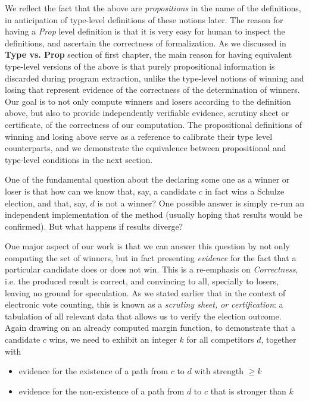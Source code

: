 \noindent
We reflect the fact that the above are \emph{propositions} in
the name of the definitions, in anticipation of type-level
definitions of these notions later. The reason for having a \textit{Prop} level definition is that 
 it is very easy for human to inspect the definitions, and ascertain the correctness of formalization.
As we discussed in 
\textbf{Type vs. Prop} section of first chapter, the main reason 
for having equivalent
type-level versions of the above is that purely propositional
information is discarded during program extraction, unlike
the type-level notions of winning and losing that represent evidence
of the correctness of the determination of winners. Our goal is to 
not only compute winners and losers according to the
definition above, but also to provide independently verifiable
evidence, scrutiny sheet or certificate, of the correctness of our computation. The propositional
definitions of winning and losing above serve as a reference to
calibrate their type level counterparts, and we demonstrate the
equivalence between propositional and type-level conditions in the
next section. 


\label{sec:prop-type}
One of the fundamental question about the declaring some one 
as a winner or loser is that 
how can we know that, say, a candidate $c$ in fact wins a
Schulze election, and that, say, $d$ is not a winner? One possible 
answer is simply  re-run an independent implementation of the method
(usually hoping that results would be confirmed). But what happens
if results diverge?  

One major aspect of our work is that we can answer this question
by not only computing the set of winners, but in fact presenting
\emph{evidence} for the fact that a particular
candidate does or does not
win. This is a re-emphasis on \emph{Correctness}, i.e. the produced result is correct, 
and convincing to all, specially to losers, leaving  no ground for speculation. As we stated earlier that 
in the context of
electronic vote counting, this is known as a
\emph{scrutiny sheet, or certification}: a tabulation of all relevant data that allows
us to verify the election outcome.
Again drawing on an already computed margin function, to
demonstrate that a candidate $c$ wins, we need to exhibit an integer
$k$ for all competitors $d$, together with
\begin{itemize}
  \item evidence for the existence of a path from $c$ to $d$ with
  strength $\geq k$
  \item evidence for the non-existence of a path from $d$ to $c$
  that is stronger than $k$
\end{itemize}


